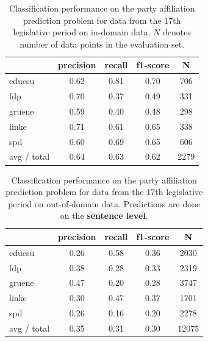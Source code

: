 \documentclass{article}
\begin{document}
\begin{table}[t]
\caption{
\label{tab:results_in-domain}
Classification performance on the party affiliation prediction problem for data from the 17th legislative period on in-domain data. $N$ denotes number of data points in the evaluation set.
}
\begin{center}
\begin{tabular}{lcccc}
    &         precision    &recall &  f1-score  & N  \\
\hline \hline
       cducsu   &    0.62  &    0.81  &    0.70  &     706\\
        fdp    &   0.70   &   0.37  &    0.49    &   331\\
     gruene &      0.59  &    0.40   &   0.48   &    298\\
      linke    &   0.71   &   0.61  &    0.65    &   338\\
        spd   &    0.60   &   0.69  &    0.65   &    606\\
\hline
avg / total &      0.64   &   0.63   &   0.62    &  2279 
%
\end{tabular}
\end{center}
\end{table}

\begin{table}[t]
\caption{
\label{tab:results_out-of-domain}
Classification performance on the party affiliation prediction problem for data from the 17th legislative period on out-of-domain data.  Predictions are done on the {\bf sentence level}.
}
\begin{center}
\begin{tabular}{lcccc}
    &         precision    &recall &  f1-score  & N  \\
\hline \hline
    cducsu    &   0.26   &   0.58   &   0.36    &   2030 \\
    fdp    &   0.38   &   0.28   &   0.33    &   2319 \\
     gruene   &    0.47    &  0.20   &   0.28    &  3747\\
      linke     &  0.30  &    0.47    &  0.37    &   1701\\
        spd     &  0.26  &    0.16   &   0.20    &   2278\\
\hline
avg / total    &   0.35  &    0.31  &    0.30   &   12075\\
%
\end{tabular}
\end{center}

\end{table}
\end{document}
